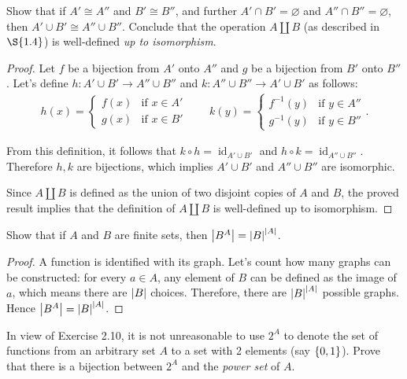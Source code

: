 \begin{exercise}{2.9}
	Show that if $A'\cong A''$ and $B'\cong B''$, and further $A'\cap B' = \varnothing$ and $A''\cap B'' = \varnothing$, then $A'\cup B' \cong A''\cup B''$. Conclude that the operation $A\coprod B$ (as described in $\S{1.4}$) is well-defined \textit{up to isomorphism}.
\end{exercise}

\begin{proof}
	Let $f$ be a bijection from $A'$ onto $A''$ and $g$ be a bijection from $B'$ onto $B''$. Let's define $h: A'\cup B' \to A''\cup B''$ and $k: A''\cup B''\to A'\cup B'$ as follows:
	\begin{align*}
		h(x) = \begin{cases}
			       f(x) & \text{if $x\in A'$} \\
			       g(x) & \text{if $x\in B'$}
		       \end{cases}
		\qquad
		k(y) = \begin{cases}
			       f^{-1}(y) & \text{if $y\in A''$} \\
			       g^{-1}(y) & \text{if $y\in B''$}
		       \end{cases}.
	\end{align*}

	From this definition, it follows that $k\circ h = \operatorname{id}_{A'\cup B'}$ and $h\circ k = \operatorname{id}_{A''\cup B''}$. Therefore $h, k$ are bijections, which implies $A'\cup B'$ and $A''\cup B''$ are isomorphic.

	Since $A\coprod B$ is defined as the union of two disjoint copies of $A$ and $B$, the proved result implies that the definition of $A\coprod B$ is well-defined up to isomorphism.
\end{proof}

\begin{exercise}{2.10}\label{exercise:1-2.10}
	Show that if $A$ and $B$ are finite sets, then $\left\vert{B^{A}}\right\vert = {\left\vert{B}\right\vert}^{\left\vert{A}\right\vert}$.
\end{exercise}

\begin{proof}
	A function is identified with its graph. Let's count how many graphs can be constructed: for every $a\in A$, any element of $B$ can be defined as the image of $a$, which means there are $\left\vert{B}\right\vert$ choices. Therefore, there are ${\left\vert{B}\right\vert}^{\left\vert{A}\right\vert}$ possible graphs. Hence $\left\vert{B^{A}}\right\vert = {\left\vert{B}\right\vert}^{\left\vert{A}\right\vert}$.
\end{proof}

\begin{exercise}{2.11}
	In view of Exercise 2.10, it is not unreasonable to use $2^{A}$ to denote the set of functions from an arbitrary set $A$ to a set with 2 elements (say $\left\{{0, 1}\right\}$). Prove that there is a bijection between $2^{A}$ and the \textit{power set} of $A$.
\end{exercise}


